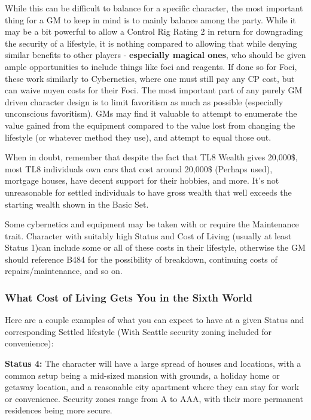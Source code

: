 \begin{multicols}{2}
	While this can be difficult to balance for a specific character, the most important thing for a GM to keep in mind is to mainly balance among the party. While it may be a bit powerful to allow a Control Rig Rating 2 in return for downgrading the security of a lifestyle, it is nothing compared to allowing that while denying similar benefits to other players - \textbf{especially magical ones}, who should be given ample opportunities to include things like foci and reagents. If done so for Foci, these work similarly to Cybernetics, where one must still pay any CP cost, but can waive nuyen costs for their Foci. The most important part of any purely GM driven character design is to limit favoritism as much as possible (especially unconscious favoritism). GMs may find it valuable to attempt to enumerate the value gained from the equipment compared to the value lost from changing the lifestyle (or whatever method they use), and attempt to equal those out.
	
	When in doubt, remember that despite the fact that TL8 Wealth gives 20,000\$, most TL8 individuals own cars that cost around 20,000\$ (Perhaps used), mortgage houses, have decent support for their hobbies, and more. It's not unreasonable for settled individuals to have gross wealth that well exceeds the starting wealth shown in the Basic Set.
	
	Some cybernetics and equipment may be taken with or require the Maintenance trait. Character with suitably high Status and Cost of Living (usually at least Status 1)can include some or all of these costs in their lifestyle, otherwise the GM should reference B484 for the possibility of breakdown, continuing costs of repairs/maintenance, and so on.
	
	\begin{coloredbox}
	
	\subsubsection*{What Cost of Living Gets You in the Sixth World}
	
	Here are a couple examples of what you can expect to have at a given Status and corresponding Settled lifestyle (With Seattle security zoning included for convenience):
	
	\textbf{Status 4:} The character will have a large spread of houses and locations, with a common setup being a mid-sized mansion with grounds, a holiday home or getaway location, and a reasonable city apartment where they can stay for work or convenience. Security zones range from A to AAA, with their more permanent residences being more secure. 
	

\end{coloredbox}
\end{multicols}
